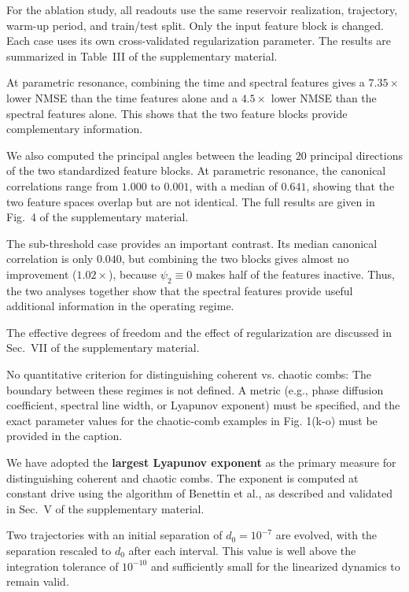 \documentclass{ar2rc}
\begin{document}
For the ablation study, all readouts use the same reservoir realization, trajectory, warm-up period, and train/test split. Only the input feature block is changed. Each case uses its own cross-validated regularization parameter. The results are summarized in Table~III of the supplementary material.

At parametric resonance, combining the time and spectral features gives a $7.35\times$ lower NMSE than the time features alone and a $4.5\times$ lower NMSE than the spectral features alone. This shows that the two feature blocks provide complementary information.

We also computed the principal angles between the leading $20$ principal directions of the two standardized feature blocks. At parametric resonance, the canonical correlations range from $1.000$ to $0.001$, with a median of $0.641$, showing that the two feature spaces overlap but are not identical. The full results are given in Fig.~4 of the supplementary material.

The sub-threshold case provides an important contrast. Its median canonical correlation is only $0.040$, but combining the two blocks gives almost no improvement ($1.02\times$), because $\psi_2 \equiv 0$ makes half of the features inactive. Thus, the two analyses together show that the spectral features provide useful additional information in the operating regime.

The effective degrees of freedom and the effect of regularization are discussed in Sec.~VII of the supplementary material.

\RC \label{rev:2.2}No quantitative criterion for distinguishing coherent vs. chaotic combs: The boundary between these regimes is not defined. A metric (e.g., phase diffusion coefficient, spectral line width, or Lyapunov exponent) must be specified, and the exact parameter values for the chaotic-comb examples in Fig. 1(k-o) must be provided in the caption.

\AR We have adopted the \textbf{largest Lyapunov exponent} as the primary measure for distinguishing coherent and chaotic combs. The exponent is computed at constant drive using the algorithm of Benettin et al., as described and validated in Sec.~V of the supplementary material.

Two trajectories with an initial separation of $d_0=10^{-7}$ are evolved, with the separation rescaled to $d_0$ after each interval. This value is well above the integration tolerance of $10^{-10}$ and sufficiently small for the linearized dynamics to remain valid.
\end{document}
